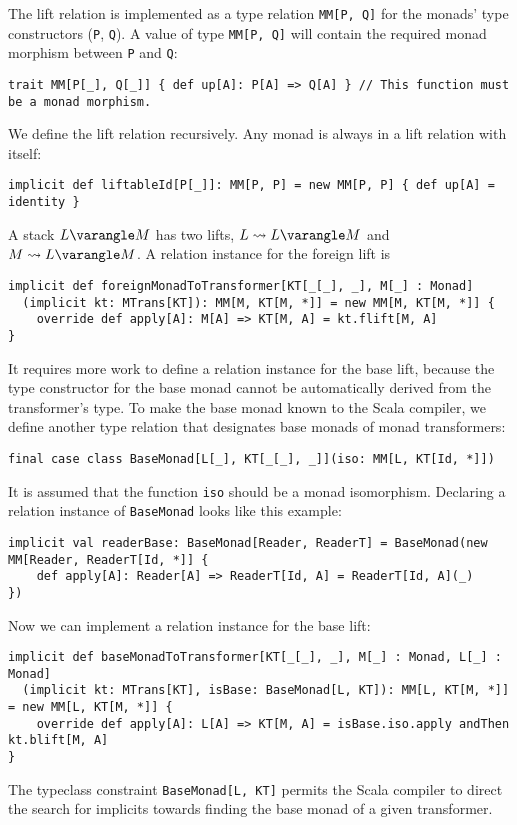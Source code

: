 The lift relation is implemented as a type relation \lstinline!MM[P, Q]!
for the monads\textsf{'} type constructors (\lstinline!P!, \lstinline!Q!).
A value of type \lstinline!MM[P, Q]! will contain the required monad
morphism between \lstinline!P! and \lstinline!Q!:
\begin{lstlisting}
trait MM[P[_], Q[_]] { def up[A]: P[A] => Q[A] } // This function must be a monad morphism.
\end{lstlisting}
We define the lift relation recursively. Any monad is always in a
lift relation with itself:
\begin{lstlisting}
implicit def liftableId[P[_]]: MM[P, P] = new MM[P, P] { def up[A] = identity }
\end{lstlisting}
A stack $L\varangle M$ has two lifts, $L\leadsto L\varangle M$ and
$M\leadsto L\varangle M$. A relation instance for the foreign lift
is
\begin{lstlisting}
implicit def foreignMonadToTransformer[KT[_[_], _], M[_] : Monad]
  (implicit kt: MTrans[KT]): MM[M, KT[M, *]] = new MM[M, KT[M, *]] {
    override def apply[A]: M[A] => KT[M, A] = kt.flift[M, A]
}
\end{lstlisting}
It requires more work to define a relation instance for the base lift,
because the type constructor for the base monad cannot be automatically
derived from the transformer\textsf{'}s type. To make the base monad known
to the Scala compiler, we define another type relation that designates
base monads of monad transformers:
\begin{lstlisting}
final case class BaseMonad[L[_], KT[_[_], _]](iso: MM[L, KT[Id, *]])
\end{lstlisting}
It is assumed that the function \lstinline!iso! should be a monad
isomorphism. Declaring a relation instance of \lstinline!BaseMonad!
looks like this example:
\begin{lstlisting}
implicit val readerBase: BaseMonad[Reader, ReaderT] = BaseMonad(new MM[Reader, ReaderT[Id, *]] {
    def apply[A]: Reader[A] => ReaderT[Id, A] = ReaderT[Id, A](_)
})
\end{lstlisting}
Now we can implement a relation instance for the base lift:
\begin{lstlisting}
implicit def baseMonadToTransformer[KT[_[_], _], M[_] : Monad, L[_] : Monad]
  (implicit kt: MTrans[KT], isBase: BaseMonad[L, KT]): MM[L, KT[M, *]] = new MM[L, KT[M, *]] {
    override def apply[A]: L[A] => KT[M, A] = isBase.iso.apply andThen kt.blift[M, A]
}
\end{lstlisting}
The typeclass constraint \lstinline!BaseMonad[L, KT]! permits the
Scala compiler to direct the search for implicits towards finding
the base monad of a given transformer.

